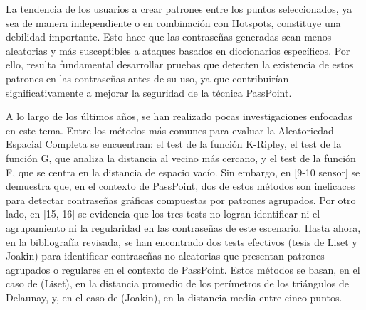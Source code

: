 \documentclass[12pt]{report}
\begin{document}
	La tendencia de los usuarios a crear patrones entre los puntos seleccionados, ya sea de manera independiente o en combinación con Hotspots, constituye una debilidad importante. Esto hace que las contraseñas generadas sean menos aleatorias y más susceptibles a ataques basados en diccionarios específicos. Por ello, resulta fundamental desarrollar pruebas que detecten la existencia de estos patrones en las contraseñas antes de su uso, ya que contribuirían significativamente a mejorar la seguridad de la técnica PassPoint.
	
	
	
	
	
	
	
	A lo largo de los últimos años, se han realizado pocas investigaciones enfocadas en este tema. Entre los métodos más comunes para evaluar la Aleatoriedad Espacial Completa se encuentran: el test de la función K-Ripley, el test de la función G, que analiza la distancia al vecino más cercano, y el test de la función F, que se centra en la distancia de espacio vacío. Sin embargo, en [9-10 sensor] se demuestra que, en el contexto de PassPoint, dos de estos métodos son ineficaces para detectar contraseñas gráficas compuestas por patrones agrupados. Por otro lado, en [15, 16] se evidencia que los tres tests no logran identificar ni el agrupamiento ni la regularidad en las contraseñas de este escenario. Hasta ahora, en la bibliografía revisada, se han encontrado dos tests efectivos (tesis de Liset y Joakin) para identificar contraseñas no aleatorias que presentan patrones agrupados o regulares en el contexto de PassPoint. Estos métodos se basan, en el caso de (Liset), en la distancia promedio de los perímetros de los triángulos de Delaunay, y, en el caso de (Joakin), en la distancia media entre cinco puntos.
	
\end{document}
